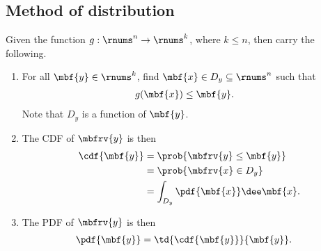 \subsection{Method of distribution}
\begin{myBlackBox}
    Given the function $g:\rnums^{n}\to\rnums^{k}$, where $k\leq n$, then carry the following. 
    \begin{enumerate}
        \item For all $\mbf{y}\in\rnums^{k}$, find $\mbf{x}\in D_{y}\subseteq \rnums^{n}$ such that
        \begin{align}
            g(\mbf{x}) &\leq \mbf{y}.
        \end{align}
        Note that $D_{y}$ is a function of $\mbf{y}$.
        \item The CDF of $\mbfrv{y}$ is then
        \begin{align}
            \cdf{\mbf{y}} 
            &= \prob{\mbfrv{y}\leq \mbf{y}}\\
            &= \prob{\mbfrv{x}\in D_{y}}\\
            &= \int_{D_{y}} \pdf{\mbf{x}}\dee\mbf{x}.
        \end{align}
        \item The PDF of $\mbfrv{y}$ is then
        \begin{align}
            \pdf{\mbf{y}} &= 
            \td{\cdf{\mbf{y}}}{\mbf{y}}.
        \end{align}
    \end{enumerate}
\end{myBlackBox}

